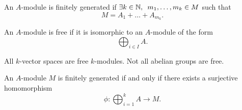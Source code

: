 \begin{df}
  An $A$-module is finitely generated if
  $\exists k \in \mathbb N, \enspace m_1, \ldots, m_k \in M$
  such that
  \[M = A_1 + \ldots + A_{m_k}.\]
\end{df}

\begin{df}
  An $A$-module is free if it is isomorphic to an $A$-module of the form
  \[ \bigoplus_{i \in I} A.\]
\end{df}

\begin{example}
  All $k$-vector spaces are free $k$-modules. Not all abelian groups are free.
\end{example}

\begin{lemma}
  An $A$-module $M$ is finitely generated if and only if there exists a surjective homomorphism
  \[ \phi: \bigoplus_{i=1}^k A \to M.\]
\end{lemma}

